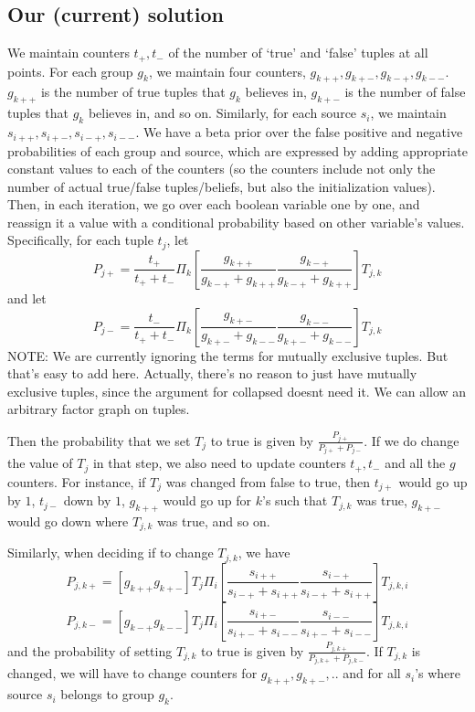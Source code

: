 \documentclass{sig-alternate}
\newcounter{prob}
\begin{document}
\subsection{Our (current) solution}
We maintain counters $t_{+}, t_{-}$ of the number of `true' and `false' tuples at all points. For each group $g_k$, we maintain four counters, $g_{k++}, g_{k+-}, g_{k-+}, g_{k--}$. $g_{k++}$ is the number of true tuples that $g_k$ believes in, $g_{k+-}$ is the number of false tuples that $g_k$ believes in, and so on. Similarly, for each source $s_i$, we maintain $s_{i++}, s_{i+-}, s_{i-+}, s_{i--}$. We have a beta prior over the false positive and negative probabilities of each group and source, which are expressed by adding appropriate constant values to each of the counters (so the counters include not only the number of actual true/false tuples/beliefs, but also the initialization values). Then, in each iteration, we go over each boolean variable one by one, and reassign it a value with a conditional probability based on other variable's values. Specifically, for each tuple $t_j$, let 
$$P_{j+} = \frac{t_{+}}{t_{+}+t_{-}}\Pi_{k}\left[ \frac{g_{k++}}{g_{k-+} + g_{k++}} \frac{g_{k-+}}{g_{k-+} + g_{k++}}  \right] T_{j, k}$$ 
and let 
$$P_{j-} = \frac{t_{-}}{t_{+}+t_{-}}\Pi_{k}\left[ \frac{g_{k+-}}{g_{k+-} + g_{k--}} \frac{g_{k--}}{g_{k+-} + g_{k--}}  \right] T_{j, k}$$ 
NOTE: We are currently ignoring the terms for mutually exclusive tuples. But that's easy to add here. Actually, there's no reason to just have mutually exclusive tuples, since the argument for collapsed doesnt need it. We can allow an arbitrary factor graph on tuples. 

Then the probability that we set $T_j$ to true is given by $\frac{P_{j+}}{P_{j+}+P_{j-}}$. If we do change the value of $T_j$ in that step, we also need to update counters $t_{+}, t_{-}$ and all the $g$ counters. For instance, if $T_j$ was changed from false to true, then $t_{j+}$ would go up by $1$, $t_{j-}$ down by $1$, $g_{k++}$ would go up for $k$'s such that $T_{j,k}$ was true, $g_{k+-}$ would go down where $T_{j,k}$ was true, and so on. 

Similarly, when deciding if to change $T_{j,k}$, we have
$$P_{j,k+} = [g_{k++} g_{k+-}] T_j \Pi_{i}\left[ \frac{s_{i++}}{s_{i-+} + s_{i++}} \frac{s_{i-+}}{s_{i-+} + s_{i++}}  \right] T_{j, k, i}$$ 
$$P_{j,k-} = [g_{k-+} g_{k--}] T_j \Pi_{i}\left[ \frac{s_{i+-}}{s_{i+-} + s_{i--}} \frac{s_{i--}}{s_{i+-} + s_{i--}}  \right] T_{j, k, i}$$ 
and the probability of setting $T_{j,k}$ to true is given by $\frac{P_{j,k+}}{P_{j,k+} + P_{j,k-}}$. If $T_{j,k}$ is changed, we will have to change counters for $g_{k++}, g_{k+-}, ..$ and for all $s_i$'s where source $s_i$ belongs to group $g_k$.
\end{document}
